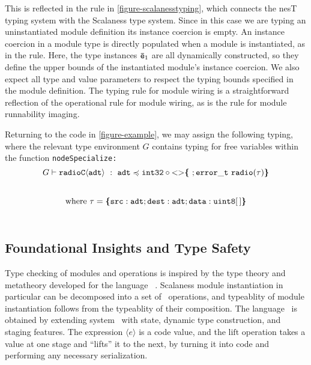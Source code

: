 This is reflected in the  rule in \autoref{figure-scalanesstyping}, which connects
the nesT typing system with the Scalaness type system. Since in this case we are typing an
uninstantiated module definition its instance coercion is empty. An instance coercion in a
module type is directly populated when a module is instantiated, as in the 
rule. Here, the type instances ${\mathtt{\bar{e}}}_1$ are all dynamically constructed, so they define the
upper bounds of the instantiated module's instance coercion. We also expect all type and value
parameters to respect the typing bounds specified in the module definition.
The  typing rule for module wiring is a straightforward reflection of the
operational rule for module wiring, as is the  rule for module runnability
imaging.
\begin{exmp}
\label{example-scalanesstyping}
Returning to the code in \autoref{figure-example}, we may assign the following typing, where the
relevant type environment $G$ contains typing for free variables within the function
\tt{nodeSpecialize}:
$$
  G \vdash \mathtt{radioC\langle adt \rangle}\ :\  
    \mathtt{adt} \preccurlyeq \mathtt{int32} \circ \mathrm{<}\mathrm{>}\textup{\textbf{\{}}\ ;
      \mathtt{error\_t\ radio(\tau)} \textup{\textbf{\}}}
$$
$$
\text{where}\ \tau = \textup{\textbf{\{}} \mathtt{src : adt}; \mathtt{dest : adt}; \mathtt{data : uint8[\,]} \textup{\textbf{\}}} 
$$
\end{exmp}

\subsection{Foundational Insights and Type Safety} 
\label{section-framedml}

Type checking of modules and operations is inspired by the type theory and metatheory developed
for the language \fml\ \cite{FramedML}. Scalaness module instantiation in particular can be
decomposed into a set of \fml\ operations, and typeablity of module instantiation follows from
the typeablity of their composition. The language \fml\ is obtained by extending system \fsub\
with state, dynamic type construction, and staging features. The expression $\langle e \rangle$
is a code value, and the $\mathrm{lift}$ operation takes a value at one stage and ``lifts'' it
to the next, by turning it into code and performing any necessary serialization.

